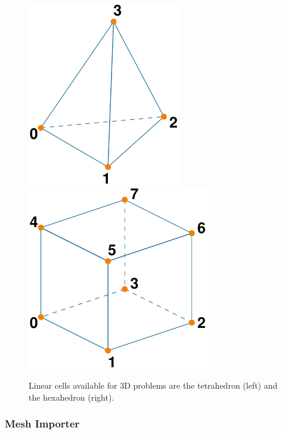 \noindent \begin{center}
\begin{figure}[H]
\noindent \begin{centering}
\includegraphics{runpylith/figs/tet4}\hspace*{0.5in}\includegraphics{runpylith/figs/hex8}
\par\end{centering}

\caption{Linear cells available for 3D problems are the tetrahedron (left)
and the hexahedron (right).\label{fig:3D-linear-elements}}
\end{figure}

\par\end{center}


\subsubsection{Mesh Importer}

